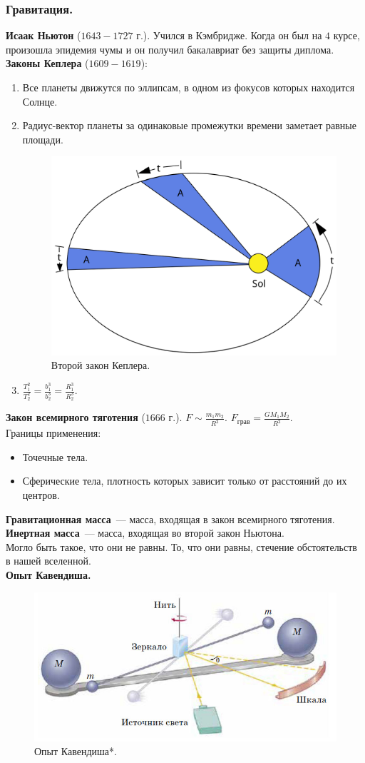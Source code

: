 \documentclass{article}
\begin{document}
	\subsubsection{Гравитация.}
	\textbf{Исаак Ньютон} ($1643 - 1727$ г.). Учился в Кэмбридже. Когда он был на $4$ курсе, произошла эпидемия чумы и он получил бакалавриат без защиты диплома. \\
	\textbf{Законы Кеплера} ($1609 - 1619$):
	\begin{enumerate}
		\item Все планеты движутся по эллипсам, в одном из фокусов которых находится Солнце.
		\item Радиус-вектор планеты за одинаковые промежутки времени заметает равные площади. \\
		\begin{figure}[H]
			\includegraphics[height=0.25\textwidth]{extra-materials/Второй-закон-Кеплера}
			\caption{Второй закон Кеплера.}
		\end{figure}
		\item $\frac{T_1^2}{T_2^2} = \frac{b_1^3}{b_2^3} = \frac{R_1^3}{R_2^3}$.
	\end{enumerate}
	\textbf{Закон всемирного тяготения} ($1666$ г.). $F \sim \frac{m_1m_2}{R^2}$. $F_{\text{грав}} = \frac{GM_1M_2}{R^2}$. \\
	Границы применения:
	\begin{itemize}
		\item Точечные тела.
		\item Сферические тела, плотность которых зависит только от расстояний до их центров.
	\end{itemize}
	\textbf{Гравитационная масса}~--- масса, входящая в закон всемирного тяготения. \\
	\textbf{Инертная масса}~--- масса, входящая во второй закон Ньютона. \\
	Могло быть такое, что они не равны. То, что они равны, стечение обстоятельств в нашей вселенной. \\
	\textbf{Опыт Кавендиша.}
	\begin{figure}[H]
		\includegraphics[height=0.25\textwidth]{extra-materials/Опыт-Кавендиша}
		\caption{Опыт Кавендиша*.}
	\end{figure}
\end{document}
